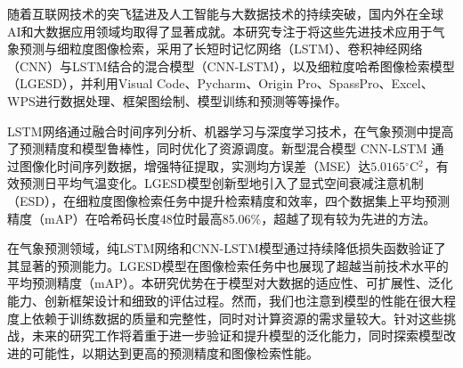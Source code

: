 \begin{titlepage}
\begin{cnabstract}




随着互联网技术的突飞猛进及人工智能与大数据技术的持续突破，国内外在全球AI和大数据应用领域均取得了显著成就。本研究专注于将这些先进技术应用于气象预测与细粒度图像检索，采用了长短时记忆网络（LSTM）、卷积神经网络（CNN）与LSTM结合的混合模型（CNN-LSTM），以及细粒度哈希图像检索模型（LGESD），并利用Visual Code、Pycharm、Origin Pro、SpassPro、Excel、WPS进行数据处理、框架图绘制、模型训练和预测等等操作。

LSTM网络通过融合时间序列分析、机器学习与深度学习技术，在气象预测中提高了预测精度和模型鲁棒性，同时优化了资源调度。新型混合模型 CNN-LSTM 通过图像化时间序列数据，增强特征提取，实测均方误差（MSE）达$5.0165 {}^{\circ}\text{C}{}^2$，有效预测日平均气温变化。LGESD模型创新型地引入了显式空间衰减注意机制（ESD），在细粒度图像检索任务中提升检索精度和效率，四个数据集上平均预测精度（mAP）在哈希码长度48位时最高85.06\%，超越了现有较为先进的方法。

在气象预测领域，纯LSTM网络和CNN-LSTM模型通过持续降低损失函数验证了其显著的预测能力。LGESD模型在图像检索任务中也展现了超越当前技术水平的平均预测精度（mAP）。本研究优势在于模型对大数据的适应性、可扩展性、泛化能力、创新框架设计和细致的评估过程。然而，我们也注意到模型的性能在很大程度上依赖于训练数据的质量和完整性，同时对计算资源的需求量较大。针对这些挑战，未来的研究工作将着重于进一步验证和提升模型的泛化能力，同时探索模型改进的可能性，以期达到更高的预测精度和图像检索性能。


\end{cnabstract}
\end{titlepage}
